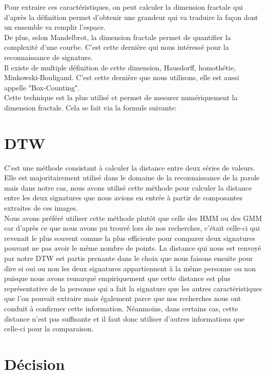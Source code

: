 \documentclass[fontsize=11pt, twoside=no]{scrartcl} %
\begin{document}
Pour extraire ces caractéristiques, on peut calculer la dimension fractale qui d'après la définition permet d'obtenir une grandeur qui va traduire la façon dont un ensemble va remplir l'espace.\\

De plus, selon Mandelbrot, la dimension fractale permet de quantifier la complexité d'une courbe. C'est cette dernière qui nous intéressé pour la reconnaissance de signature.\\

Il existe de multiple définition de cette dimension, Hausdorff, homothétie, Minkowski-Bouligand. C'est cette dernière que nous utilisons, elle est aussi appelle "Box-Counting".\\

Cette technique est la plus utilisé et permet de mesurer numériquement la dimension fractale. Cela se fait via la formule suivante:

\vspace{0.3cm}
\begin{center}
\end{center}

\newpage

\part{DTW}
C'est une méthode consistant à calculer la distance entre deux séries de valeurs. Elle est majoritairement utilisé dans le domaine de la reconnaissance de la parole mais dans notre cas, nous avons utilisé cette méthode pour calculer la distance entre les deux signatures que nous avions en entrée à partir de composantes extraites de ces images. \\

Nous avons préféré utiliser cette méthode plutôt que celle des HMM ou des GMM car d'après ce que nous avons pu trouvé lors de nos recherches, c'était celle-ci qui revenait le plus souvent comme la plus efficiente pour comparer deux signatures pouvant ne pas avoir le même nombre de points. La distance qui nous est renvoyé par notre DTW est partis prenante dans le choix que nous faisons ensuite pour dire si oui ou non les deux signatures appartiennent à la même personne ou non puisque nous avons remarqué empiriquement que cette distance est plus représentative de la personne qui a fait la signature que les autres caractéristiques que l'on pouvait extraire mais également parce que nos recherches nous ont conduit à confirmer cette information. Néanmoins, dans certains cas, cette distance n'est pas suffisante et il faut donc utiliser d'autres informations que celle-ci pour la comparaison.

\part{Décision}
\end{document}
